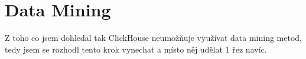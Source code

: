 \chapter{Data Mining}
Z toho co jsem dohledal tak ClickHouse neumožňuje využívat data mining metod, tedy jsem
se rozhodl tento krok vynechat a místo něj udělat 1 řez navíc.